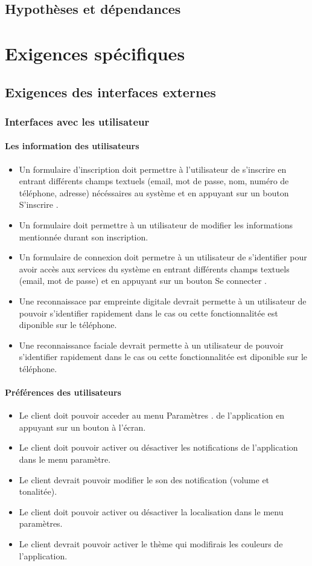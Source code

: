 \documentclass{article}
\begin{document}
\subsection{Hypothèses et dépendances}


\section{Exigences spécifiques}
\subsection{Exigences des interfaces externes}
\subsubsection{Interfaces avec les utilisateur}
\paragraph{Les information des utilisateurs}
\begin{itemize}
 \item Un formulaire d'inscription doit permettre à l'utilisateur de
   s'inscrire en entrant différents champs textuels (email, mot de
   passe, nom, numéro de téléphone, adresse) nécéssaires au
   système et en appuyant sur
   un bouton \og S'inscrire \fg{}.
\item Un formulaire doit permettre à un utilisateur de modifier les
  informations mentionnée durant son inscription.
\item Un formulaire de connexion doit permetre à un utilisateur de
  s'identifier pour avoir accès aux services du système en entrant
  différents champs textuels (email, mot de passe) et en appuyant sur
  un bouton \og Se connecter \fg{}.
\item Une reconnaissace par empreinte digitale devrait permette à un
  utilisateur de pouvoir s'identifier rapidement dans le cas ou cette
  fonctionnalitée est diponible sur le téléphone.
\item Une reconnaissance faciale devrait permette à un
  utilisateur de pouvoir s'identifier rapidement dans le cas ou cette
  fonctionnalitée est diponible sur le téléphone.
\end{itemize}
\paragraph{Préférences des utilisateurs}
\begin{itemize}
\item Le client doit pouvoir acceder au menu \og Paramètres \fg{}. de l'application en
  appuyant sur un bouton à l'écran.
\item Le client doit pouvoir activer ou désactiver les notifications
  de l'application dans le menu paramètre.
\item Le client devrait pouvoir modifier le son des notification
  (volume et tonalitée).
\item Le client doit pouvoir activer ou désactiver la localisation
  dans le menu paramètres.
\item Le client devrait pouvoir activer le thème qui modifirais les
  couleurs de l'application. 
\end{itemize}
\end{document}
